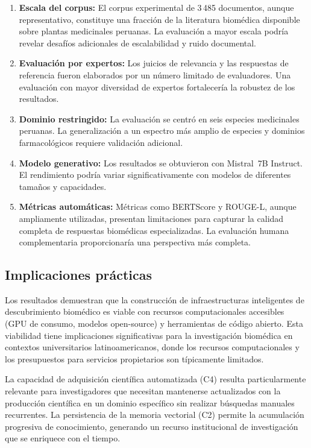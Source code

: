 \begin{enumerate}[label=(\roman*)]
  \item \textbf{Escala del corpus:} El corpus experimental de 3\,485 documentos, aunque representativo, constituye una fracción de la literatura biomédica disponible sobre plantas medicinales peruanas. La evaluación a mayor escala podría revelar desafíos adicionales de escalabilidad y ruido documental.

  \item \textbf{Evaluación por expertos:} Los juicios de relevancia y las respuestas de referencia fueron elaborados por un número limitado de evaluadores. Una evaluación con mayor diversidad de expertos fortalecería la robustez de los resultados.

  \item \textbf{Dominio restringido:} La evaluación se centró en seis especies medicinales peruanas. La generalización a un espectro más amplio de especies y dominios farmacológicos requiere validación adicional.

  \item \textbf{Modelo generativo:} Los resultados se obtuvieron con Mistral~7B Instruct. El rendimiento podría variar significativamente con modelos de diferentes tamaños y capacidades.

  \item \textbf{Métricas automáticas:} Métricas como BERTScore y ROUGE-L, aunque ampliamente utilizadas, presentan limitaciones para capturar la calidad completa de respuestas biomédicas especializadas. La evaluación humana complementaria proporcionaría una perspectiva más completa.
\end{enumerate}

\subsection{Implicaciones prácticas}
\label{subsec:disc_implications}

Los resultados demuestran que la construcción de infraestructuras inteligentes de descubrimiento biomédico es viable con recursos computacionales accesibles (GPU de consumo, modelos open-source) y herramientas de código abierto. Esta viabilidad tiene implicaciones significativas para la investigación biomédica en contextos universitarios latinoamericanos, donde los recursos computacionales y los presupuestos para servicios propietarios son típicamente limitados.

La capacidad de adquisición científica automatizada (C4) resulta particularmente relevante para investigadores que necesitan mantenerse actualizados con la producción científica en un dominio específico sin realizar búsquedas manuales recurrentes. La persistencia de la memoria vectorial (C2) permite la acumulación progresiva de conocimiento, generando un recurso institucional de investigación que se enriquece con el tiempo.

